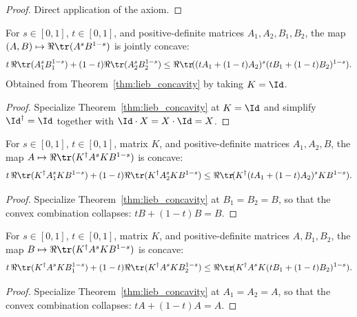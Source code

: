 \begin{proof}\leanok
    Direct application of the axiom.
\end{proof}

\begin{corollary}[Lieb concavity, $K=\Id$ case]\label{cor:lieb_concavity_id}
    \leanok
    For $s\in[0,1]$, $t\in[0,1]$, and positive-definite matrices $A_1,A_2,B_1,B_2$, the
    map $(A,B)\mapsto\Re\tr(A^s B^{1-s})$ is jointly concave:
    \[
        t\,\Re\tr(A_1^s B_1^{1-s})+(1-t) \Re\tr(A_2^s B_2^{1-s})
        \le
        \Re\tr\!((tA_1+(1-t)A_2)^s (tB_1+(1-t)B_2)^{1-s}).
    \]
    Obtained from Theorem~\ref{thm:lieb_concavity} by taking $K=\Id$.
\end{corollary}

\begin{proof}\leanok
    Specialize Theorem~\ref{thm:lieb_concavity} at $K=\Id$ and simplify
    $\Id^{\dagger}=\Id$ together with $\Id\cdot X=X\cdot\Id=X$.
\end{proof}

\begin{corollary}
    \label{cor:lieb_concavity_in_fst}
    \leanok
    For $s\in[0,1]$, $t\in[0,1]$, matrix $K$, and positive-definite matrices $A_1,A_2,B$,
    the map $A\mapsto\Re\tr(K^\dagger A^s K B^{1-s})$ is concave:
    \[
        t\,\Re\tr(K^\dagger A_1^s K B^{1-s})
        +(1-t) \Re\tr(K^\dagger A_2^s K B^{1-s})
        \le
        \Re\tr\!(K^\dagger(tA_1+(1-t)A_2)^s K B^{1-s}).
    \]
\end{corollary}

\begin{proof}\leanok
    Specialize Theorem~\ref{thm:lieb_concavity} at $B_1=B_2=B$, so that
    the convex combination collapses: $tB+(1-t)B=B$.
\end{proof}

\begin{corollary}
    \label{cor:lieb_concavity_in_snd}
    \leanok
    For $s\in[0,1]$, $t\in[0,1]$, matrix $K$, and positive-definite matrices $A,B_1,B_2$,
    the map $B\mapsto\Re\tr(K^\dagger A^s K B^{1-s})$ is concave:
    \[
        t\,\Re\tr(K^\dagger A^s K B_1^{1-s})
        +(1-t) \Re\tr(K^\dagger A^s K B_2^{1-s})
        \le
        \Re\tr\!(K^\dagger A^s K (tB_1+(1-t)B_2)^{1-s}).
    \]
\end{corollary}

\begin{proof}\leanok
    Specialize Theorem~\ref{thm:lieb_concavity} at $A_1=A_2=A$, so that
    the convex combination collapses: $tA+(1-t)A=A$.
\end{proof}

